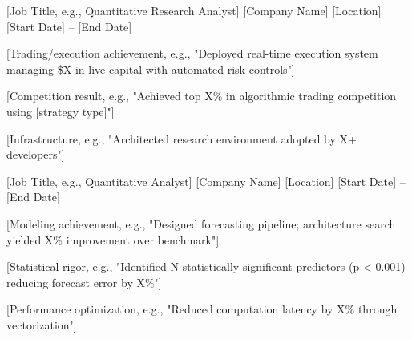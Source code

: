 

\begin{cventries}

  \cventry
    {[Job Title, e.g., Quantitative Research Analyst]} %
    {[Company Name]} %
    {[Location]} %
    {[Start Date] -- [End Date]} %
    {
      \begin{cvitems}
        \item {[Trading/execution achievement, e.g., "Deployed real-time execution system managing \$X in live capital with automated risk controls"]}
        \item {[Competition result, e.g., "Achieved top X\% in algorithmic trading competition using [strategy type]"]}
        \item {[Infrastructure, e.g., "Architected research environment adopted by X+ developers"]}
      \end{cvitems}
    }

  \cventry
    {[Job Title, e.g., Quantitative Analyst]} %
    {[Company Name]} %
    {[Location]} %
    {[Start Date] -- [End Date]} %
    {
      \begin{cvitems}
        \item {[Modeling achievement, e.g., "Designed forecasting pipeline; architecture search yielded X\% improvement over benchmark"]}
        \item {[Statistical rigor, e.g., "Identified N statistically significant predictors (p < 0.001) reducing forecast error by X\%"]}
        \item {[Performance optimization, e.g., "Reduced computation latency by X\% through vectorization"]}
      \end{cvitems}
    }

\end{cventries}
